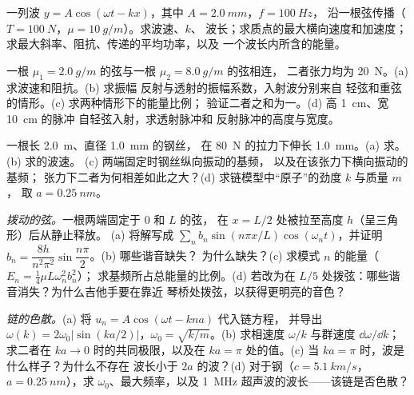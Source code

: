 \begin{exercise}[$\star\star$]\label{exo:b2:waves-on-strings:7}
一列波 $y = A\cos(\omega t - kx)$，其中 $A = \qty{2.0}{mm}$，$f = \qty{100}{Hz}$，
沿一根弦传播（$T = \qty{100}{N}$，$\mu = \qty{10}{g/m}$）。求波速、$k$、
波长；求质点的最大横向速度和加速度；
求最大斜率、阻抗、传递的平均功率，以及
一个波长内所含的能量。
\end{exercise}

\begin{exercise}[$\star\star$]\label{exo:b2:waves-on-strings:8}
一根 $\mu_1 = \qty{2.0}{g/m}$ 的弦与一根 $\mu_2 = \qty{8.0}{g/m}$ 的弦相连，
二者张力均为 \qty{20}{N}。(a) 求波速和阻抗。(b) 求振幅
反射与透射的振幅系数，入射波分别来自
轻弦和重弦的情形。(c) 求两种情形下的能量比例；
验证二者之和为一。(d) 高 \qty{1}{cm}、宽 \qty{10}{cm} 的脉冲
自轻弦入射，求透射脉冲和
反射脉冲的高度与宽度。
\end{exercise}

\begin{exercise}[$\star\star$]\label{exo:b2:waves-on-strings:9}
一根长 \qty{2.0}{m}、直径 \qty{1.0}{mm} 的钢丝，
在 \qty{80}{N} 的拉力下伸长 \qty{1.0}{mm}。(a) 求。(b) 求的波速。
(c) 两端固定时钢丝纵向振动的基频，
以及在该张力下横向振动的基频；
张力下二者为何相差如此之大？(d) 求链模型中“原子”的劲度 $k$ 与质量 $m$，
取 $a = \qty{0.25}{nm}$。
\end{exercise}

\begin{exercise}[$\star\star\star$]\label{exo:b2:waves-on-strings:10}
\emph{拨动的弦。}一根两端固定于 $0$ 和 $L$ 的弦，
在 $x = L/2$ 处被拉至高度 $h$（呈三角形）后从静止释放。
(a) 将解写成 $\sum_nb_n\sin(n\pi x/L)\cos(\omega_nt)$，并证明
$b_n = \dfrac{8h}{n^2\pi^2}\sin\dfrac{n\pi}2$。(b) 哪些谐音缺失？
为什么缺失？(c) 求模式 $n$ 的能量（$E_n = \tfrac14\mu L\omega_n^2b_n^2$）；
求基频所占总能量的比例。(d) 若改为在
$L/5$ 处拨弦：哪些谐音消失？为什么吉他手要在靠近
琴桥处拨弦，以获得更明亮的音色？
\end{exercise}

\begin{exercise}[$\star\star\star$]\label{exo:b2:waves-on-strings:11}
\emph{链的色散。}(a) 将 $u_n = A\cos(\omega t - kna)$ 代入链方程，
并导出 $\omega(k) = 2\omega_0|\sin(ka/2)|$，$\omega_0 =
\sqrt{k/m}$。(b) 求相速度 $\omega/k$ 与群速度 $\dd\omega/\dd k$；
求二者在 $ka \to 0$ 时的共同极限，以及在 $ka = \pi$ 处的值。(c)
当 $ka = \pi$ 时，波是什么样子？为什么不存在
波长小于 $2a$ 的波？(d) 对于钢（$c = \qty{5.1}{km/s}$，$a =
\qty{0.25}{nm}$），求 $\omega_0$、最大频率，以及
\qty{1}{MHz} 超声波的波长——该链是否色散？
\end{exercise}

